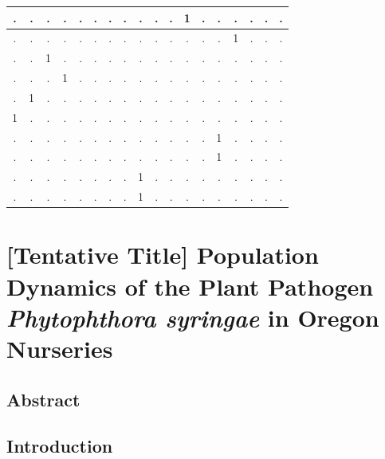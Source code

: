 \documentclass[double,12pt]{beavtex}
\begin{document}
\begin{tabular}{c|c|c|c|c|c|c|c|c|c|c|c|c|c|c|c|c|c}
  \hline
  . & . & . & . & . & . & . & . & . & . & . & 1 & . & . & . & . & . & .\\
  \hline
  . & . & . & . & . & . & . & . & . & . & . & . & . & . & 1 & . & . & .\\
  \hline
  . & . & 1 & . & . & . & . & . & . & . & . & . & . & . & . & . & . & .\\
  \hline
  . & . & . & 1 & . & . & . & . & . & . & . & . & . & . & . & . & . & .\\
  \hline
  . & 1 & . & . & . & . & . & . & . & . & . & . & . & . & . & . & . & .\\
  \hline
  1 & . & . & . & . & . & . & . & . & . & . & . & . & . & . & . & . & .\\
  \hline
  . & . & . & . & . & . & . & . & . & . & . & . & . & 1 & . & . & . & .\\
  \hline
  . & . & . & . & . & . & . & . & . & . & . & . & . & 1 & . & . & . & .\\
  \hline
  . & . & . & . & . & . & . & . & 1 & . & . & . & . & . & . & . & . & .\\
  \hline
  . & . & . & . & . & . & . & . & 1 & . & . & . & . & . & . & . & . & .\\
  \hline
  \end{tabular}
  
  \chapter{\texorpdfstring{{[}Tentative Title{]} Population Dynamics of
  the Plant Pathogen \emph{Phytophthora syringae} in Oregon
  Nurseries}{{[}Tentative Title{]} Population Dynamics of the Plant Pathogen Phytophthora syringae in Oregon Nurseries}}\label{tentative-title-population-dynamics-of-the-plant-pathogen-phytophthora-syringae-in-oregon-nurseries}
  
  \section{Abstract}\label{abstract-3}
  
  \section{Introduction}\label{introduction-2}
  
\end{document}
